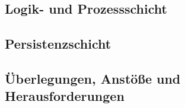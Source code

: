 
    \subsection{Logik- und Prozessschicht}

    \subsection*{Persistenzschicht}


    \subsection{Überlegungen, Anstöße und Herausforderungen}

